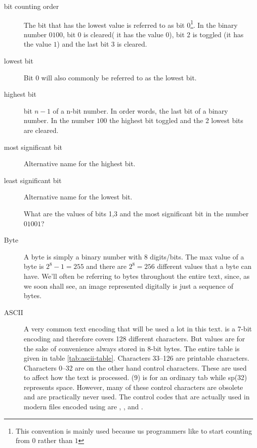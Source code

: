 \begin{description}
\item[bit counting order] The bit that has the lowest value is
  referred to as bit 0\footnote{This convention is mainly used because
    us programmers like to start counting from $0$ rather than $1$}.
  In the binary number $0100$, bit 0 is cleared( it has the value
  $0$), bit 2 is toggled (it has the value $1$) and the last bit 3 is
  cleared.

\item[lowest bit] Bit 0 will also commonly be referred to as the
  lowest bit.

\item[highest bit] bit $n-1$ of a n-bit number. In order words, the
  last bit of a binary number. In the number $100$ the highest bit
  toggled and the 2 lowest bits are cleared.

\item[most significant bit] Alternative name for the highest bit.

\item[least significant bit] Alternative name for the lowest bit.

  \begin{Exercise}[label={bits-value-order}]
    What are the values of bits 1,3 and the most significant bit in the
    number $01001$?

  \end{Exercise}

\item[Byte] A byte is simply a binary number with 8 digits/bits. The
  max value of a byte is $2^8 - 1 = 255$ and there are $2^8 = 256$
  different values that a byte can have. We'll often be referring to
  bytes throughout the entire text, since, as we soon shall see, an
  image represented digitally is just a sequence of bytes.

\item[ASCII] A very common text encoding that will be used a lot in
  this text. \ascii is a 7-bit encoding and therefore covers 128
  different characters. But \ascii values are for the sake of
  convenience always stored in 8-bit bytes. The entire \ascii table is
  given in table \ref{tab:ascii-table}\cite{rfc20}. Characters 33--126
  are printable characters. Characters 0--32 are on the other hand
  control characters. These are used to affect how the text is
  processed. \htab(9) is for an ordinary tab while {\acronymstyle sp}(32) represents
  space. However, many of these control characters are obsolete and
  are practically never used. The control codes that are actually used
  in modern files encoded using \ascii are \nul, \htab, \lf and \cret
  \cite{maini2007digital}.


\end{description}
